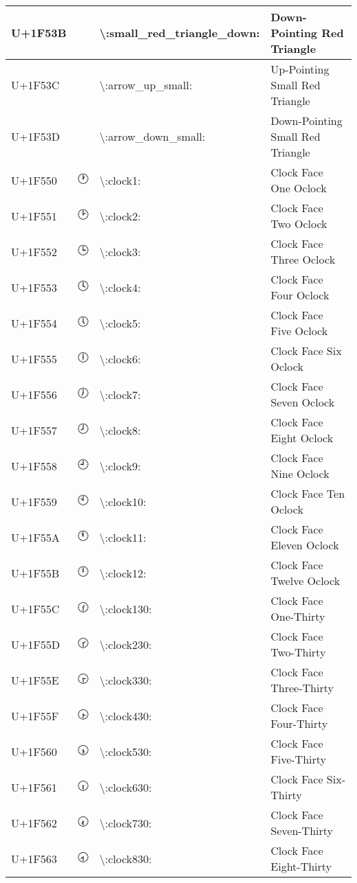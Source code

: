 \begin{table}[h]
\begin{tabulary}{\linewidth}{|L|L|L|L|}
\hline
U+1F53B & 🔻 & {\textbackslash}:small\_red\_triangle\_down: & Down-Pointing Red Triangle \\
\hline
U+1F53C & 🔼 & {\textbackslash}:arrow\_up\_small: & Up-Pointing Small Red Triangle \\
\hline
U+1F53D & 🔽 & {\textbackslash}:arrow\_down\_small: & Down-Pointing Small Red Triangle \\
\hline
U+1F550 & 🕐 & {\textbackslash}:clock1: & Clock Face One Oclock \\
\hline
U+1F551 & 🕑 & {\textbackslash}:clock2: & Clock Face Two Oclock \\
\hline
U+1F552 & 🕒 & {\textbackslash}:clock3: & Clock Face Three Oclock \\
\hline
U+1F553 & 🕓 & {\textbackslash}:clock4: & Clock Face Four Oclock \\
\hline
U+1F554 & 🕔 & {\textbackslash}:clock5: & Clock Face Five Oclock \\
\hline
U+1F555 & 🕕 & {\textbackslash}:clock6: & Clock Face Six Oclock \\
\hline
U+1F556 & 🕖 & {\textbackslash}:clock7: & Clock Face Seven Oclock \\
\hline
U+1F557 & 🕗 & {\textbackslash}:clock8: & Clock Face Eight Oclock \\
\hline
U+1F558 & 🕘 & {\textbackslash}:clock9: & Clock Face Nine Oclock \\
\hline
U+1F559 & 🕙 & {\textbackslash}:clock10: & Clock Face Ten Oclock \\
\hline
U+1F55A & 🕚 & {\textbackslash}:clock11: & Clock Face Eleven Oclock \\
\hline
U+1F55B & 🕛 & {\textbackslash}:clock12: & Clock Face Twelve Oclock \\
\hline
U+1F55C & 🕜 & {\textbackslash}:clock130: & Clock Face One-Thirty \\
\hline
U+1F55D & 🕝 & {\textbackslash}:clock230: & Clock Face Two-Thirty \\
\hline
U+1F55E & 🕞 & {\textbackslash}:clock330: & Clock Face Three-Thirty \\
\hline
U+1F55F & 🕟 & {\textbackslash}:clock430: & Clock Face Four-Thirty \\
\hline
U+1F560 & 🕠 & {\textbackslash}:clock530: & Clock Face Five-Thirty \\
\hline
U+1F561 & 🕡 & {\textbackslash}:clock630: & Clock Face Six-Thirty \\
\hline
U+1F562 & 🕢 & {\textbackslash}:clock730: & Clock Face Seven-Thirty \\
\hline
U+1F563 & 🕣 & {\textbackslash}:clock830: & Clock Face Eight-Thirty \\

\end{tabulary}
\end{table}
